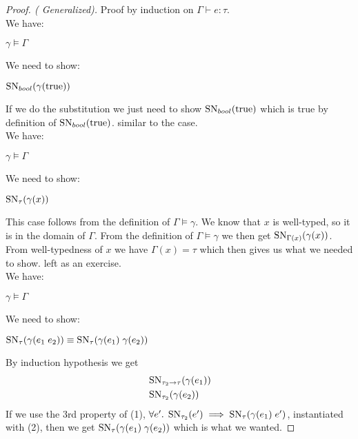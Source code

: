 \begin{proof}[Proof. ( Generalized)] Proof by induction on $\Gamma \vdash e : \tau$.
 \\
We have: 
\begin{description}
  \item $\gamma \models \Gamma$
\end{description}
We need to show:
\begin{description}
  \item $\operatorname{SN}_{bool}(\gamma(\text{true}))$
\end{description}
If we do the substitution we just need to show $\operatorname{SN}_{bool}(\text{true})$ which is true by definition of $\operatorname{SN}_{bool}(\text{true})$.
 similar to the \true{} case.
\case{\TVar}\\
We have: 
\begin{description}
  \item $\gamma \models \Gamma$
\end{description}
We need to show:
\begin{description}
  \item $\operatorname{SN}_{\tau}(\gamma(x))$
\end{description}
This case follows from the definition of $\Gamma \models \gamma$. We know that $x$ is well-typed, so it is in the domain of $\Gamma$. From the definition of $\Gamma \models \gamma$ we then get $\operatorname{SN}_{\Gamma(x)}(\gamma(x))$. From well-typedness of $x$ we have $\Gamma(x) = \tau$ which then gives us what we needed to show.
 left as an exercise.
\case{\TApp}\\
We have: 
\begin{description}
  \item $\gamma \models \Gamma$
\end{description}
We need to show:
\begin{description}
  \item $\operatorname{SN}_{\tau}(\gamma(e_1 \; e_2)) \equiv \operatorname{SN}_{\tau}(\gamma(e_1) \; \gamma(e_2))$
\end{description}
By induction hypothesis we get
\begin{align}
  &\operatorname{SN}_{ \tau_2 \rightarrow \tau}(\gamma(e_1)) \\
  &\operatorname{SN}_{\tau_2}(\gamma(e_2))
\end{align}
If we use the 3rd property of (1), $\forall e'. \; \operatorname{SN}_{\tau_2}(e') \implies \operatorname{SN}_{\tau}(\gamma(e_1) \; e')$, instantiated with (2), then we get $\operatorname{SN}_{\tau}(\gamma(e_1) \; \gamma(e_2))$ which is what we wanted.

\end{proof}
